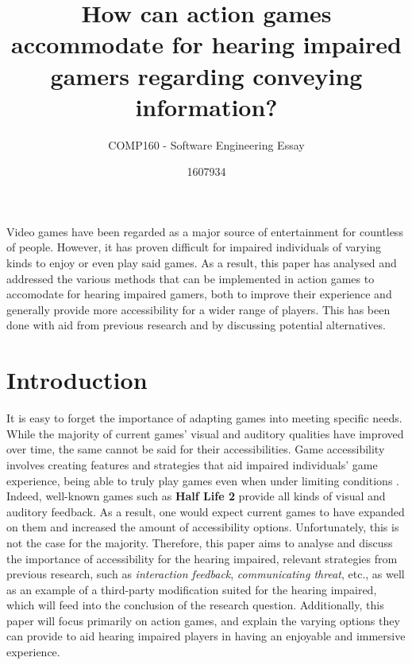 \documentclass{scrartcl}
\title{How can action games accommodate for hearing impaired gamers regarding conveying information?}
\subtitle{COMP160 - Software Engineering Essay}
\author{1607934}
\begin{document}
\maketitle

\abstract
Video games have been regarded as a major source of entertainment for countless of people. However, it has proven difficult for impaired individuals of varying kinds to enjoy or even play said games. As a result, this paper has analysed and addressed the various methods that can be implemented in action games to accomodate for hearing impaired gamers, both to improve their experience and generally provide more accessibility for a wider range of players. This has been done with aid from previous research and by discussing potential alternatives.

\section{Introduction}
It is easy to forget the importance of adapting games into meeting specific needs. While the majority of current games' visual and auditory qualities have improved over time, the same cannot be said for their accessibilities. \cite{McPheron} Game accessibility involves creating features and strategies that aid impaired individuals' game experience, being able to truly play games even when under limiting conditions \cite{Bierre}. Indeed, well-known games such as \textbf{Half Life 2} provide all kinds of visual and auditory feedback. \cite{Denise} \cite{Coutinho} As a result, one would expect current games to have expanded on them and increased the amount of accessibility options. Unfortunately, this is not the case for the majority. Therefore, this paper aims to analyse and discuss the importance of accessibility for the hearing impaired, relevant strategies from previous research, such as \textit{interaction feedback}, \textit{communicating threat}, etc., as well as an example of a third-party modification suited for the hearing impaired, which will feed into the conclusion of the research question. \cite{Denise} \cite{Arch} Additionally, this paper will focus primarily on action games, and explain the varying options they can provide to aid hearing impaired players in having an enjoyable and immersive experience.
\end{document}

